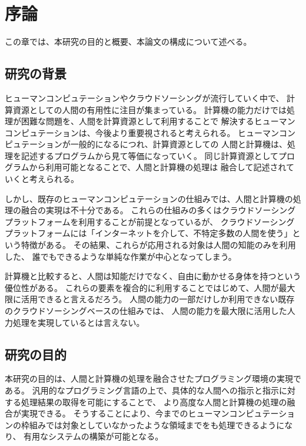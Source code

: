 \chapter{序論}\label{chap:introduction}

この章では、本研究の目的と概要、本論文の構成について述べる。

\newpage

\section{研究の背景}\label{ux7814ux7a76ux306eux80ccux666f}

ヒューマンコンピュテーションやクラウドソーシングが流行していく中で、
計算資源としての人間の有用性に注目が集まっている。
計算機の能力だけでは処理が困難な問題を、人間を計算資源として利用することで
解決するヒューマンコンピュテーションは、今後より重要視されると考えられる。
ヒューマンコンピュテーションが一般的になるにつれ、計算資源としての
人間と計算機は、処理を記述するプログラムから見て等価になっていく。
同じ計算資源としてプログラムから利用可能となることで、人間と計算機の処理は
融合して記述されていくと考えられる。

しかし、既存のヒューマンコンピュテーションの仕組みでは、人間と計算機の処理の融合の実現は不十分である。
これらの仕組みの多くはクラウドソーシングプラットフォームを利用することが前提となっているが、
クラウドソーシングプラットフォームには「インターネットを介して、不特定多数の人間を使う」という特徴がある。
その結果、これらが応用される対象は人間の知能のみを利用した、
誰でもできるような単純な作業が中心となってしまう。

計算機と比較すると、人間は知能だけでなく、自由に動かせる身体を持つという優位性がある。
これらの要素を複合的に利用することではじめて、人間が最大限に活用できると言えるだろう。
人間の能力の一部だけしか利用できない既存のクラウドソーシングベースの仕組みでは、
人間の能力を最大限に活用した人力処理を実現しているとは言えない。

\section{研究の目的}\label{ux7814ux7a76ux306eux76eeux7684}

本研究の目的は、人間と計算機の処理を融合させたプログラミング環境の実現である。
汎用的なプログラミング言語の上で、具体的な人間への指示と指示に対する処理結果の取得を可能にすることで、
より高度な人間と計算機の処理の融合が実現できる。
そうすることにより、今までのヒューマンコンピュテーションの枠組みでは対象としていなかったような領域までをも処理できるようになり、
有用なシステムの構築が可能となる。

